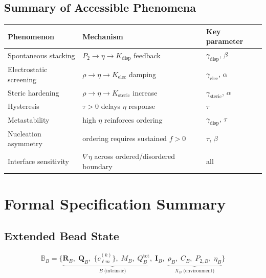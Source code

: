 \documentclass[11pt]{article}
\begin{document}
\subsection{Summary of Accessible Phenomena}

\begin{center}
\begin{tabular}{lll}
    \textbf{Phenomenon} & \textbf{Mechanism} & \textbf{Key parameter} \\
    \hline
    Spontaneous stacking & $P_2 \to \eta \to K_{\mathrm{disp}}$ feedback
        & $\gamma_{\mathrm{disp}}$, $\beta$ \\
    Electrostatic screening & $\rho \to \eta \to K_{\mathrm{elec}}$ damping
        & $\gamma_{\mathrm{elec}}$, $\alpha$ \\
    Steric hardening & $\rho \to \eta \to K_{\mathrm{steric}}$ increase
        & $\gamma_{\mathrm{steric}}$, $\alpha$ \\
    Hysteresis & $\tau > 0$ delays $\eta$ response
        & $\tau$ \\
    Metastability & high $\eta$ reinforces ordering
        & $\gamma_{\mathrm{disp}}$, $\tau$ \\
    Nucleation asymmetry & ordering requires sustained $f > 0$
        & $\tau$, $\beta$ \\
    Interface sensitivity & $\nabla \eta$ across ordered/disordered boundary
        & all \\
\end{tabular}
\end{center}

\section{Formal Specification Summary}

\subsection{Extended Bead State}

\begin{equation}
    \mathbb{B}_B = \bigl\{
        \underbrace{
            \mathbf{R}_B,\;
            \mathbf{Q}_B,\;
            \{c_{\ell m}^{(k)}\},\;
            M_B,\;
            Q_B^{\mathrm{tot}},\;
            \mathbf{I}_B
        }_{B\;\text{(intrinsic)}},\;
        \underbrace{
            \rho_B,\;
            C_B,\;
            P_{2,B},\;
            \eta_B
        }_{X_B\;\text{(environment)}}
    \bigr\}
\end{equation}
\end{document}
